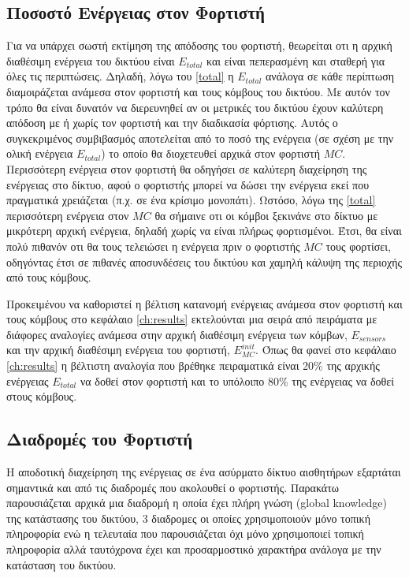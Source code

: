 \subsection{Ποσοστό Ενέργειας στον Φορτιστή}
Για να υπάρχει σωστή εκτίμηση της απόδοσης του φορτιστή, θεωρείται οτι η αρχική διαθέσιμη ενέργεια του δικτύου είναι $E_{total}$ και είναι πεπερασμένη και σταθερή
για όλες τις περιπτώσεις. Δηλαδή, λόγω του \ref{total} η $E_{total}$ ανάλογα σε κάθε περίπτωση διαμοιράζεται ανάμεσα στον φορτιστή και τους κόμβους του δικτύου. Με
αυτόν τον τρόπο θα είναι δυνατόν να διερευνηθεί αν οι μετρικές του δικτύου έχουν καλύτερη απόδοση με ή χωρίς τον φορτιστή και την διαδικασία φόρτισης. Αυτός ο
συγκεκριμένος συμβιβασμός αποτελείται από το ποσό της ενέργεια (σε σχέση με την ολική ενέργεια $E_{total}$) το οποίο θα διοχετευθεί αρχικά στον φορτιστή $MC$.
Περισσότερη ενέργεια στον φορτιστή θα οδηγήσει σε καλύτερη διαχείρηση της ενέργειας στο δίκτυο, αφού ο φορτιστής μπορεί να δώσει την ενέργεια εκεί που πραγματικά
χρειάζεται (π.χ. σε ένα κρίσιμο μονοπάτι). Ωστόσο, λόγω της \ref{total} περισσότερη ενέργεια στον $MC$ θα σήμαινε οτι οι κόμβοι ξεκινάνε στο δίκτυο με μικρότερη
αρχική ενέργεια, δηλαδή χωρίς να είναι πλήρως φορτισμένοι. Έτσι, θα είναι πολύ πιθανόν οτι θα τους τελειώσει η ενέργεια πριν ο φορτιστής $MC$ τους φορτίσει,
οδηγόντας έτσι σε πιθανές αποσυνδέσεις του δικτύου και χαμηλή κάλυψη της περιοχής από τους κόμβους.

Προκειμένου να καθοριστεί η βέλτιση κατανομή ενέργειας ανάμεσα
στον φορτιστή και τους κόμβους στο κεφάλαιο \ref{ch:results} εκτελούνται μια σειρά από πειράματα με διάφορες αναλογίες ανάμεσα στην αρχική διαθέσιμη ενέργεια των
κόμβων, $E_{sensors}$ και την αρχική διαθέσιμη ενέργεια του φορτιστή, $E^{init}_{MC}$. Όπως θα φανεί στο κεφάλαιο \ref{ch:results} η βέλτιστη αναλογία που
βρέθηκε πειραματικά είναι 20\% της αρχικής ενέργειας $E_{total}$ να δοθεί στον φορτιστή και το υπόλοιπο 80\% της ενέργειας να δοθεί στους κόμβους.

\subsection{Διαδρομές του Φορτιστή}
Η αποδοτική διαχείρηση της ενέργειας σε ένα ασύρματο δίκτυο αισθητήρων εξαρτάται σημαντικά και από τις διαδρομές που ακολουθεί ο φορτιστής. Παρακάτω παρουσιάζεται
αρχικά μια διαδρομή η οποία έχει πλήρη γνώση (global knowledge) της κατάστασης του δικτύου, 3 διαδρομες οι οποίες χρησιμοποιούν μόνο τοπική πληροφορία ενώ η
τελευταία που παρουσιάζεται όχι μόνο χρησιμοποιεί τοπική πληροφορία αλλά ταυτόχρονα έχει και προσαρμοστικό χαρακτήρα ανάλογα με την κατάσταση του δικτύου.

